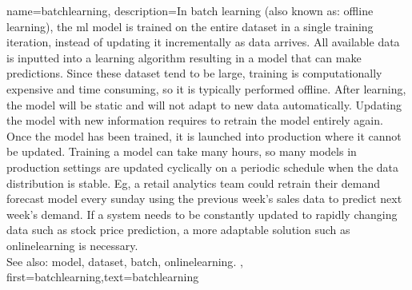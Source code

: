 {name={batchlearning},
description={In batch learning (also known as: offline learning), the \gls{ml} \gls{model} is trained on the entire \gls{dataset} in a single training iteration, instead of updating it incrementally as \gls{data} arrives. All available \gls{data} is inputted into a learning \gls{algorithm} resulting in a \gls{model} that can make predictions. Since these \gls{dataset} tend to be large,
training is computationally expensive and time consuming, so it is typically performed offline. After learning, the \gls{model} will be static and will not adapt to new \gls{data} automatically. Updating the \gls{model} with new information requires to retrain the \gls{model} entirely again. Once the model has been trained, it is launched into production where it cannot be updated. 
Training a model can take many hours, so many models in production settings are updated cyclically on a periodic schedule when the data distribution is stable. Eg, a retail analytics team could retrain their demand forecast model every sunday using the previous week's sales data to predict next week's demand. 
If a system needs to be constantly updated to rapidly changing data such as stock price prediction, a more adaptable solution such as \gls{onlinelearning} is necessary.\\
See also: \gls{model}, \gls{dataset}, \gls{batch}, \gls{onlinelearning}. },
	first={batchlearning},text={batchlearning}
} 


